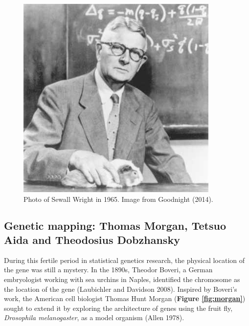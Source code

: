 \documentclass[
]{book}
\begin{document}
\begin{figure}

{\centering \includegraphics[width=0.8\linewidth]{figs/introduction/Sewall_Wright} 

}

\caption{Photo of Sewall Wright in 1965. Image from Goodnight (2014).}\label{fig:wright}
\end{figure}

\hypertarget{mapping-sec}{%
\subsection{Genetic mapping: Thomas Morgan, Tetsuo Aida and Theodosius Dobzhansky}\label{mapping-sec}}

During this fertile period in statistical genetics research, the physical location of the gene was still a mystery. In the 1890s, Theodor Boveri, a German embryologist working with sea urchins in Naples, identified the chromosome as the location of the gene (Laubichler and Davidson 2008). Inspired by Boveri's work, the American cell biologist Thomas Hunt Morgan (\textbf{Figure \ref{fig:morgan}}) sought to extend it by exploring the architecture of genes using the fruit fly, \emph{Drosophila melanogaster}, as a model organism (Allen 1978).
\end{document}
